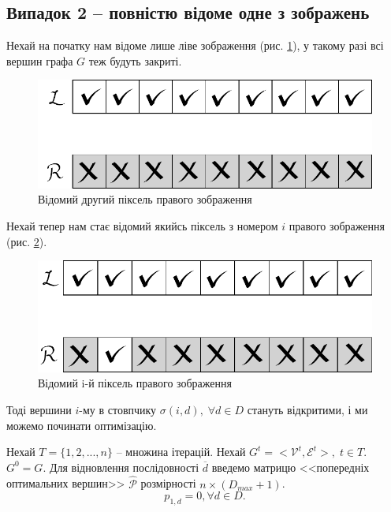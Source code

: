 \documentclass{ConfFTI}
\begin{document}
 \subsection{Випадок 2 -- повністю відоме одне з зображень} \label{2.2}
Нехай на початку нам відоме лише ліве зображення (рис. \ref{2.2oneimage}), у такому разі всі вершин графа $G$ теж будуть закриті.
\begin{figure}[h!]
	\centering
	\includegraphics[scale = 0.5]{allclosed.pdf}
	\caption{Відомий другий піксель правого зображення}
	\label{2.2oneimage}
\end{figure}

Нехай тепер нам стає відомий якийсь піксель з номером $ i $ правого зображення (рис. \ref{2.2oneRpixel}). 
\begin{figure}[h!]
	\centering
	\includegraphics[scale = 0.5]{pixelknown.pdf}
	\caption{Відомий i-й піксель правого зображення}
	\label{2.2oneRpixel}
\end{figure}

Тоді вершини $i$-му в стовпчику $ \sigma(i, d), \; \forall d \in D $ стануть відкритими, і ми можемо починати оптимізацію.

Нехай $ T = \{1, 2, ..., n\} $ -- множина ітерацій. Нехай $G^t = <\mathcal{V}^t, \mathcal{E}^t>, \; t \in T$. $G^0 = G$.
Для відновлення послідовності $\overline{d}$ введемо матрицю <<попередніх оптимальних вершин>> $\hat{\mathcal{P}}$ розмірності $n \times (D_{max} + 1)$.  
$$p_{1,d} = 0, \forall d \in D. $$
\newpage
\end{document}
